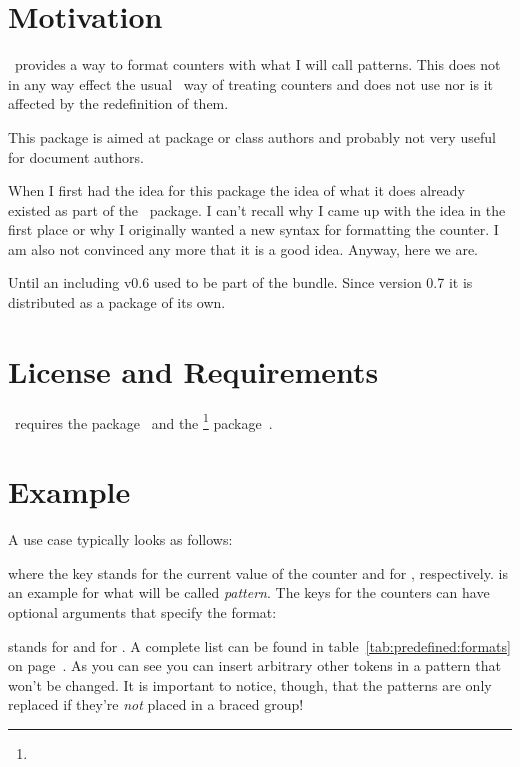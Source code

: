 \documentclass[load-preamble+]{cnltx-doc}
\begin{document}
\section{Motivation}
\cntformats\ provides a way to format counters with what I will call patterns.
This does not in any way effect the usual \LaTeXe\ way of treating counters
and does not use  nor is it affected by the redefinition of
them.

This package is aimed at package or class authors and probably not very useful
for document authors.

When I first had the idea for this package the idea of what it does already
existed as part of the \ExSheets\ package.  I can't recall why I came up with
the idea in the first place or why I originally wanted a new syntax for
formatting the  counter.  I am also not convinced any more that
it is a good idea.  Anyway, here we are.

Until an including v0.6 \cntformats{} used to be part of
the \ExSheets{} bundle.  Since version 0.7 it is distributed as a package of
its own.

\section{License and Requirements}\label{sec:license}
\license

\cntformats\ requires the  package~\cite{pkg:etoolbox}
and the \footnote{} package~\cite{bnd:cnltx}.

\section{Example}
A use case typically looks as follows:
\begin{example}
\end{example}
where the key  stands for the current value of the 
counter and  for , respectively.  is
an example for what will be called \emph{pattern}. The keys for the counters
can have optional arguments that specify the format:
\begin{example}
\end{example}
 stands for  and  for .  A complete list
can be found in table~\ref{tab:predefined:formats} on
page~\pageref{tab:predefined:formats}.  As you can see you can insert
arbitrary other tokens in a pattern that won't be changed. It is important to
notice, though, that the patterns are only replaced if they're \emph{not}
placed in a braced group!
\end{document}
